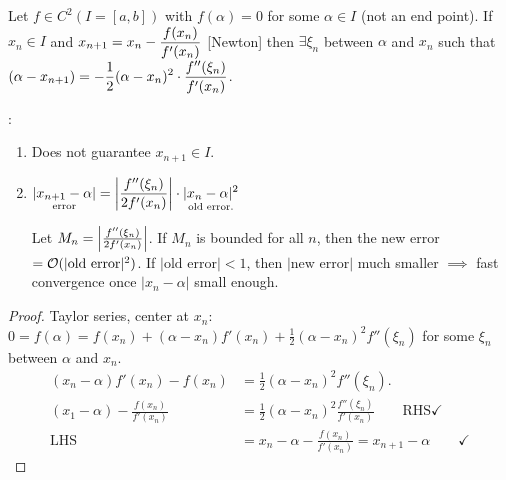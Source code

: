\documentclass[]{article}
\begin{document}
\begin{theorem}
	Let $f\in C^2(I=[a,b])$ with $f(\alpha)=0$ for some $\alpha\in I$ (not an end point).
	If $x_n\in I$ and $\displaystyle x_{n+1}=x_n-\frac{f(x_n)}{f'(x_n)}$ [Newton] then $\exists\xi_n$ between $\alpha$ and $x_n$ such that $\displaystyle(\alpha-x_{n+1}) = -\frac12(\alpha-x_n)^2 \cdot \frac{f''(\xi_n)}{f'(x_n)}$.
\end{theorem}
\begin{note}:
	\begin{enumerate}
		\item Does not guarantee $x_{n+1}\in I$.
		\item $\displaystyle \underset{\text{error}}{|x_{n+1}-\alpha|} = \left|\frac{f''(\xi_n)}{2f'(x_n)}\right|\cdot \underset{\text{old error.}}{|x_n-\alpha|^2}$
			
			Let $M_n= \left|\frac{f''(\xi_n)}{2f'(x_n)}\right|$.
			If $M_n$ is bounded for all $n$, then the new error $=\mathcal{O}(|\text{old error}|^2)$.
			If $|\text{old error}|<1$, then $|\text{new error}|$ much smaller $\implies$ fast convergence once $|x_n-\alpha|$ small enough.
	\end{enumerate}
\end{note}
\begin{proof}
	Taylor series, center at $x_n$: $0 = f(\alpha) = f(x_n) + (\alpha-x_n)f'(x_n) + \frac12(\alpha-x_n)^2 f''(\xi_n)$ for some $\xi_n$ between $\alpha$ and $x_n$.
	\begin{align*}
		(x_n-\alpha)f'(x_n)-f(x_n) &= \frac12(\alpha-x_n)^2f''(\xi_n). \\
		(x_1-\alpha) - \frac{f(x_n)}{f'(x_n)} &= \frac12(\alpha-x_n)^2\frac{f''(\xi_n)}{f'(x_n)} \qquad \text{RHS}\checkmark \\
		\text{LHS} &= x_n - \alpha -\frac{f(x_n)}{f'(x_n)}
				   = x_{n+1} - \alpha \qquad \checkmark
	\end{align*}
\end{proof}
\end{document}
